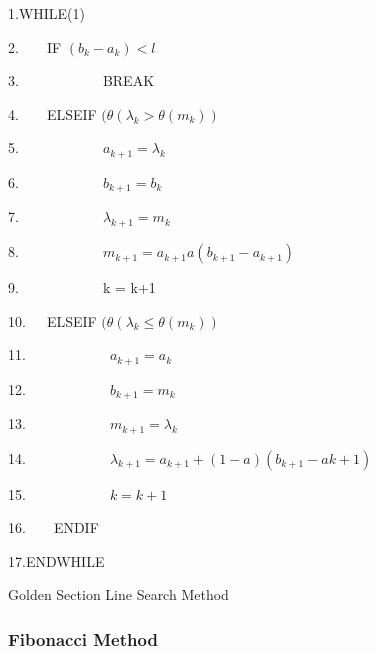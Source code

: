 \documentclass[times,12pt]{ACME2015article}
\newenvironment{lyxcode}
{\par\begin{list}{}{
\setlength{\rightmargin}{\leftmargin}
\setlength{\listparindent}{0pt}%
\raggedright
\setlength{\itemsep}{0pt}
\setlength{\parsep}{0pt}
\normalfont\ttfamily}%
 \item[]}
{\end{list}}
\begin{document}
\begin{algorithm}
\begin{lyxcode}
1.WHILE(1)

2.~~~~IF $(b_{k} - a_{k}) < l$

3.~~~~~~~~~~~~BREAK

4.~~~~ELSEIF $(\theta(\lambda_{k} > \theta(m_{k}))$

5.~~~~~~~~~~~~$a_{k+1} = \lambda_{k}$

6.~~~~~~~~~~~~$b_{k+1} = b_{k}$

7.~~~~~~~~~~~~$\lambda_{k+1} = m_{k}$

8.~~~~~~~~~~~~$m_{k+1} = a_{k+1} a(b_{k+1} - a_{k+1})$

9.~~~~~~~~~~~~k = k+1	

10.~~~ELSEIF $(\theta(\lambda_{k} \leq \theta(m_{k}))$

11.~~~~~~~~~~~~$a_{k+1} = a_{k}$

12.~~~~~~~~~~~~$b_{k+1} = m_{k}$

13.~~~~~~~~~~~~$m_{k+1} = \lambda_{k}$

14.~~~~~~~~~~~~$\lambda_{k+1} = a_{k+1} + (1 - a)(b_{k+1} - a{k+1})$

15.~~~~~~~~~~~~$k = k+1$

16.~~~~ENDIF

17.ENDWHILE

\end{lyxcode}
\protect\caption{\label{alg7}Golden Section Line Search Method}
\end{algorithm}
\clearpage

\subsubsection{Fibonacci Method}
\end{document}
